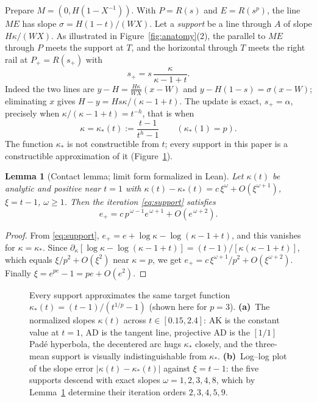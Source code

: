 \documentclass[10pt,a4paper]{article}
\theoremstyle{plain}
\newtheorem{lemma}[theorem]{Lemma}
\theoremstyle{remark}
\numberwithin{equation}{section}
\begin{document}
Prepare $M=(0,H(1-X^{-1}))$. With $P=R(s)$ and $E=R(s^{p})$, the line $ME$ has slope
$\sigma=H(1-t)/(WX)$. Let a \emph{support} be a line through $A$ of slope $H\kappa/(WX)$. As illustrated in
Figure~\ref{fig:anatomy}(2), the parallel to $ME$ through $P$ meets the support at $T$, and the horizontal
through $T$ meets the right rail at $P_+=R(s_+)$ with
\begin{equation}\label{eq:support}
s_+=s\,\frac{\kappa}{\kappa-1+t}.
\end{equation}
Indeed the two lines are $y-H=\tfrac{H\kappa}{WX}(x-W)$ and $y-H(1-s)=\sigma(x-W)$; eliminating $x$
gives $H-y=Hs\kappa/(\kappa-1+t)$. The update is exact, $s_+=\alpha$, precisely when
$\kappa/(\kappa-1+t)=t^{-h}$, that is when
\begin{equation}\label{eq:kstar}
\kappa=\kappa_*(t):=\frac{t-1}{t^{h}-1}\qquad(\kappa_*(1)=p).
\end{equation}
The function $\kappa_*$ is not constructible from $t$; every support in this paper is a constructible
approximation of it (Figure~\ref{fig:target}).

\begin{lemma}[Contact lemma; limit form formalized in Lean]\label{lem:contact}
Let $\kappa(t)$ be analytic and positive near $t=1$ with
$\kappa(t)-\kappa_*(t)=c\,\xi^{\omega}+O(\xi^{\omega+1})$, $\xi=t-1$, $\omega\ge1$. Then the iteration
\eqref{eq:support} satisfies
\[ e_+=c\,p^{\,\omega-1}e^{\,\omega+1}+O(e^{\,\omega+2}). \]
\end{lemma}
\begin{proof}
From \eqref{eq:support}, $e_+=e+\log\kappa-\log(\kappa-1+t)$, and this vanishes for
$\kappa=\kappa_*$. Since $\partial_\kappa[\log\kappa-\log(\kappa-1+t)]=(t-1)/[\kappa(\kappa-1+t)]$,
which equals $\xi/p^{2}+O(\xi^{2})$ near $\kappa=p$, we get
$e_+=c\,\xi^{\omega+1}/p^{2}+O(\xi^{\omega+2})$. Finally $\xi=e^{pe}-1=pe+O(e^{2})$.
\end{proof}

\begin{figure}[htbp]
\centering\figTarget
\caption{Every support approximates the same target function $\kappa_*(t)=(t-1)/(t^{1/p}-1)$ (shown here
for $p=3$).
\textbf{(a)}~The normalized slopes $\kappa(t)$ across $t\in[0.15,2.4]$: AK is the constant value at $t=1$,
AD is the tangent line, projective AD is the $[1/1]$ Pad\'e hyperbola, the decentered arc hugs $\kappa_*$
closely, and the three-mean support is visually indistinguishable from $\kappa_*$.
\textbf{(b)}~Log--log plot of the slope error $|\kappa(t)-\kappa_*(t)|$ against $\xi=t-1$: the five
supports descend with exact slopes $\omega=1,2,3,4,8$, which by Lemma~\ref{lem:contact} determine their
iteration orders $2,3,4,5,9$.}\label{fig:target}
\end{figure}
\end{document}
